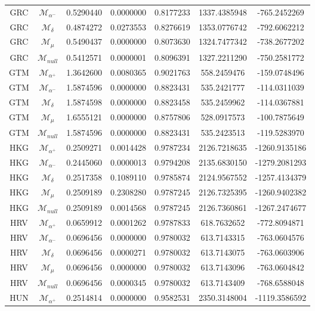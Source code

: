 \begin{tabular}{ccccccc}
GRC & $\mathcal{M}_{\alpha^-}$ & 0.5290440 & 0.0000000 & 0.8177233 & 1337.4385948 & -765.2452269\\
GRC & $\mathcal{M}_{\delta}$ & 0.4874272 & 0.0273553 & 0.8276619 & 1353.0776742 & -792.6062212\\
GRC & $\mathcal{M}_{\mu}$ & 0.5490437 & 0.0000000 & 0.8073630 & 1324.7477342 & -738.2677202\\
GRC & $\mathcal{M}_{null}$ & 0.5412571 & 0.0000001 & 0.8096391 & 1327.2211290 & -750.2581772\\
GTM & $\mathcal{M}_{\alpha^+}$ & 1.3642600 & 0.0080365 & 0.9021763 & 558.2459476 & -159.0748496\\
GTM & $\mathcal{M}_{\alpha^-}$ & 1.5874596 & 0.0000000 & 0.8823431 & 535.2421777 & -114.0311039\\
GTM & $\mathcal{M}_{\delta}$ & 1.5874598 & 0.0000000 & 0.8823458 & 535.2459962 & -114.0367881\\
GTM & $\mathcal{M}_{\mu}$ & 1.6555121 & 0.0000000 & 0.8757806 & 528.0917573 & -100.7875649\\
GTM & $\mathcal{M}_{null}$ & 1.5874596 & 0.0000000 & 0.8823431 & 535.2423513 & -119.5283970\\
HKG & $\mathcal{M}_{\alpha^+}$ & 0.2509271 & 0.0014428 & 0.9787234 & 2126.7218635 & -1260.9135186\\
HKG & $\mathcal{M}_{\alpha^-}$ & 0.2445060 & 0.0000013 & 0.9794208 & 2135.6830150 & -1279.2081293\\
HKG & $\mathcal{M}_{\delta}$ & 0.2517358 & 0.1089110 & 0.9785874 & 2124.9567552 & -1257.4134379\\
HKG & $\mathcal{M}_{\mu}$ & 0.2509189 & 0.2308280 & 0.9787245 & 2126.7325395 & -1260.9402382\\
HKG & $\mathcal{M}_{null}$ & 0.2509189 & 0.0014568 & 0.9787245 & 2126.7360861 & -1267.2474677\\
HRV & $\mathcal{M}_{\alpha^+}$ & 0.0659912 & 0.0001262 & 0.9787833 & 618.7632652 & -772.8094871\\
HRV & $\mathcal{M}_{\alpha^-}$ & 0.0696456 & 0.0000000 & 0.9780032 & 613.7143315 & -763.0604576\\
HRV & $\mathcal{M}_{\delta}$ & 0.0696456 & 0.0000271 & 0.9780032 & 613.7143075 & -763.0603906\\
HRV & $\mathcal{M}_{\mu}$ & 0.0696456 & 0.0000000 & 0.9780032 & 613.7143096 & -763.0604842\\
HRV & $\mathcal{M}_{null}$ & 0.0696456 & 0.0000345 & 0.9780032 & 613.7143409 & -768.6588048\\
HUN & $\mathcal{M}_{\alpha^+}$ & 0.2514814 & 0.0000000 & 0.9582531 & 2350.3148004 & -1119.3586592\\

\end{tabular}

